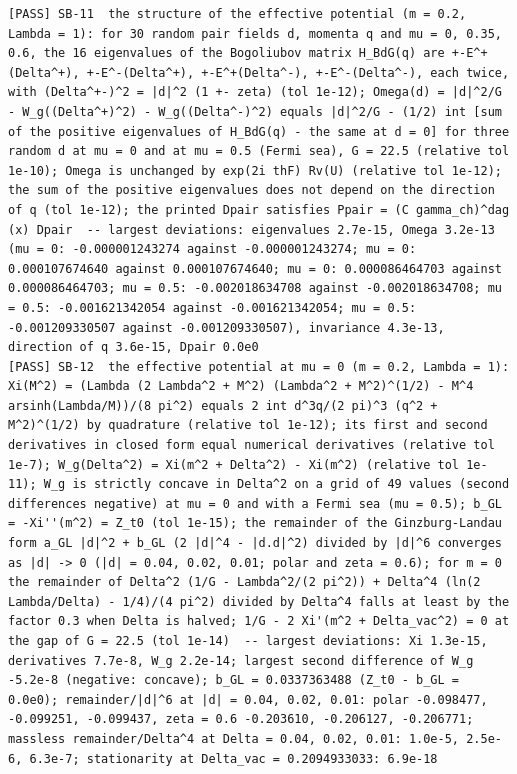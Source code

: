\documentclass[
  10pt,
]{article}
\begin{document}
\begin{verbatim}
[PASS] SB-11  the structure of the effective potential (m = 0.2, Lambda = 1): for 30 random pair fields d, momenta q and mu = 0, 0.35, 0.6, the 16 eigenvalues of the Bogoliubov matrix H_BdG(q) are +-E^+(Delta^+), +-E^-(Delta^+), +-E^+(Delta^-), +-E^-(Delta^-), each twice, with (Delta^+-)^2 = |d|^2 (1 +- zeta) (tol 1e-12); Omega(d) = |d|^2/G - W_g((Delta^+)^2) - W_g((Delta^-)^2) equals |d|^2/G - (1/2) int [sum of the positive eigenvalues of H_BdG(q) - the same at d = 0] for three random d at mu = 0 and at mu = 0.5 (Fermi sea), G = 22.5 (relative tol 1e-10); Omega is unchanged by exp(2i thF) Rv(U) (relative tol 1e-12); the sum of the positive eigenvalues does not depend on the direction of q (tol 1e-12); the printed Dpair satisfies Ppair = (C gamma_ch)^dag (x) Dpair  -- largest deviations: eigenvalues 2.7e-15, Omega 3.2e-13 (mu = 0: -0.000001243274 against -0.000001243274; mu = 0: 0.000107674640 against 0.000107674640; mu = 0: 0.000086464703 against 0.000086464703; mu = 0.5: -0.002018634708 against -0.002018634708; mu = 0.5: -0.001621342054 against -0.001621342054; mu = 0.5: -0.001209330507 against -0.001209330507), invariance 4.3e-13, direction of q 3.6e-15, Dpair 0.0e0
[PASS] SB-12  the effective potential at mu = 0 (m = 0.2, Lambda = 1): Xi(M^2) = (Lambda (2 Lambda^2 + M^2) (Lambda^2 + M^2)^(1/2) - M^4 arsinh(Lambda/M))/(8 pi^2) equals 2 int d^3q/(2 pi)^3 (q^2 + M^2)^(1/2) by quadrature (relative tol 1e-12); its first and second derivatives in closed form equal numerical derivatives (relative tol 1e-7); W_g(Delta^2) = Xi(m^2 + Delta^2) - Xi(m^2) (relative tol 1e-11); W_g is strictly concave in Delta^2 on a grid of 49 values (second differences negative) at mu = 0 and with a Fermi sea (mu = 0.5); b_GL = -Xi''(m^2) = Z_t0 (tol 1e-15); the remainder of the Ginzburg-Landau form a_GL |d|^2 + b_GL (2 |d|^4 - |d.d|^2) divided by |d|^6 converges as |d| -> 0 (|d| = 0.04, 0.02, 0.01; polar and zeta = 0.6); for m = 0 the remainder of Delta^2 (1/G - Lambda^2/(2 pi^2)) + Delta^4 (ln(2 Lambda/Delta) - 1/4)/(4 pi^2) divided by Delta^4 falls at least by the factor 0.3 when Delta is halved; 1/G - 2 Xi'(m^2 + Delta_vac^2) = 0 at the gap of G = 22.5 (tol 1e-14)  -- largest deviations: Xi 1.3e-15, derivatives 7.7e-8, W_g 2.2e-14; largest second difference of W_g -5.2e-8 (negative: concave); b_GL = 0.0337363488 (Z_t0 - b_GL = 0.0e0); remainder/|d|^6 at |d| = 0.04, 0.02, 0.01: polar -0.098477, -0.099251, -0.099437, zeta = 0.6 -0.203610, -0.206127, -0.206771; massless remainder/Delta^4 at Delta = 0.04, 0.02, 0.01: 1.0e-5, 2.5e-6, 6.3e-7; stationarity at Delta_vac = 0.2094933033: 6.9e-18

\end{verbatim}
\end{document}
